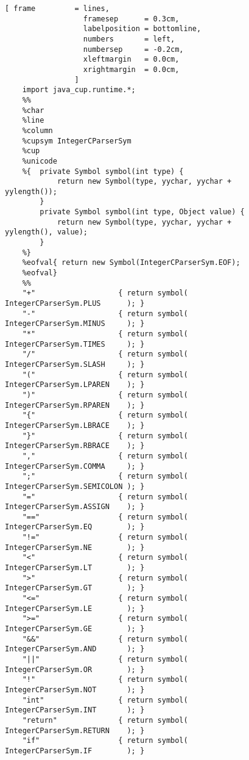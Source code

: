 \begin{figure}[!ht]
\centering
\begin{Verbatim}[ frame         = lines, 
                  framesep      = 0.3cm, 
                  labelposition = bottomline,
                  numbers       = left,
                  numbersep     = -0.2cm,
                  xleftmargin   = 0.0cm,
                  xrightmargin  = 0.0cm,
                ]
    import java_cup.runtime.*;    
    %%
    %char
    %line
    %column
    %cupsym IntegerCParserSym
    %cup
    %unicode
    %{  private Symbol symbol(int type) {
            return new Symbol(type, yychar, yychar + yylength());
        }   
        private Symbol symbol(int type, Object value) {
            return new Symbol(type, yychar, yychar + yylength(), value);
        }
    %}
    %eofval{ return new Symbol(IntegerCParserSym.EOF);
    %eofval} 
    %%
    "+"                   { return symbol( IntegerCParserSym.PLUS      ); } 
    "-"                   { return symbol( IntegerCParserSym.MINUS     ); } 
    "*"                   { return symbol( IntegerCParserSym.TIMES     ); } 
    "/"                   { return symbol( IntegerCParserSym.SLASH     ); } 
    "("                   { return symbol( IntegerCParserSym.LPAREN    ); } 
    ")"                   { return symbol( IntegerCParserSym.RPAREN    ); }
    "{"                   { return symbol( IntegerCParserSym.LBRACE    ); }
    "}"                   { return symbol( IntegerCParserSym.RBRACE    ); }
    ","                   { return symbol( IntegerCParserSym.COMMA     ); }
    ";"                   { return symbol( IntegerCParserSym.SEMICOLON ); }
    "="                   { return symbol( IntegerCParserSym.ASSIGN    ); }
    "=="                  { return symbol( IntegerCParserSym.EQ        ); }
    "!="                  { return symbol( IntegerCParserSym.NE        ); }
    "<"                   { return symbol( IntegerCParserSym.LT        ); }
    ">"                   { return symbol( IntegerCParserSym.GT        ); }
    "<="                  { return symbol( IntegerCParserSym.LE        ); }
    ">="                  { return symbol( IntegerCParserSym.GE        ); }
    "&&"                  { return symbol( IntegerCParserSym.AND       ); }
    "||"                  { return symbol( IntegerCParserSym.OR        ); }
    "!"                   { return symbol( IntegerCParserSym.NOT       ); }
    "int"                 { return symbol( IntegerCParserSym.INT       ); }
    "return"              { return symbol( IntegerCParserSym.RETURN    ); }
    "if"                  { return symbol( IntegerCParserSym.IF        ); }

\end{Verbatim}
\end{figure}
